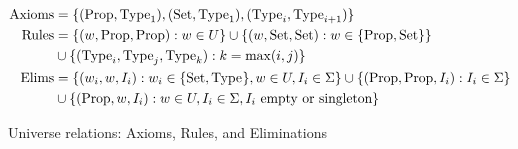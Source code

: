 \begin{figure}
\centering
\begin{align*}
\text{Axioms}
    &= \{(\text{Prop}, \text{Type}_{1}), (\text{Set}, \text{Type}_{1}), (\text{Type}_{i}, \text{Type}_{i+1})\} \\
\text{Rules}
    &= \{(w, \text{Prop}, \text{Prop}) : w \in U\}
    \cup \{(w, \text{Set}, \text{Set}) : w \in \{\text{Prop}, \text{Set}\}\} \\
    &\cup \{(\text{Type}_{i}, \text{Type}_{j}, \text{Type}_{k}) : k = \max(i, j)\} \\
\text{Elims}
    &= \{(w_i, w, I_i) : w_i \in \{\text{Set}, \text{Type}_{}\}, w \in U, I_i \in \Sigma\}
    \cup \{(\text{Prop}, \text{Prop}, I_i) : I_i \in \Sigma\} \\
    &\cup \{(\text{Prop}, w, I_i) : w \in U, I_i \in \Sigma, \text{$I_i$ empty or singleton}\}
\end{align*}
\caption{Universe relations: Axioms, Rules, and Eliminations}
\label{fig:axruel}
\end{figure}
